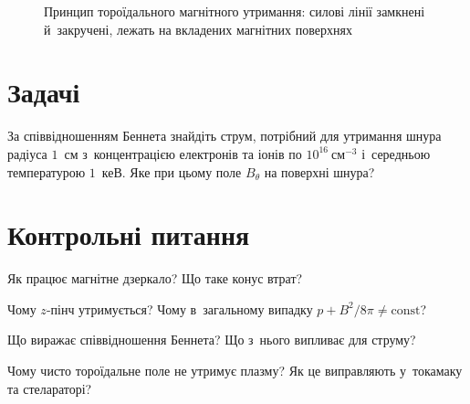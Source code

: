 \begin{figure}[h!]\centering
	\caption{Принцип тороїдального магнітного утримання: силові лінії замкнені
	й~закручені, лежать на вкладених магнітних поверхнях}
	\label{pic:toroidal-trap}
\end{figure}





\section*{Задачі}

\begin{problem}\label{prb:PlasmaBennett}
	За співвідношенням Беннета знайдіть струм, потрібний для утримання шнура радіуса
	$1$~см з~концентрацією електронів та іонів по $10^{16}~\mathrm{см}^{-3}$ і~середньою
	температурою $1$~кеВ. Яке при цьому поле $B_\theta$ на поверхні шнура?
\end{problem}

\section*{Контрольні питання}

\begin{Questions}
\begin{quizlist}
\item Як працює магнітне дзеркало? Що таке конус втрат?

\item Чому $z$-пінч утримується? Чому в~загальному випадку
		  $p+B^2/8\pi\neq\mathrm{const}$?

\item Що виражає співвідношення Беннета? Що з~нього випливає для струму?

\item Чому чисто тороїдальне поле не утримує плазму? Як це виправляють у~токамаку
		  та стелараторі?

\end{quizlist}
\end{Questions}

